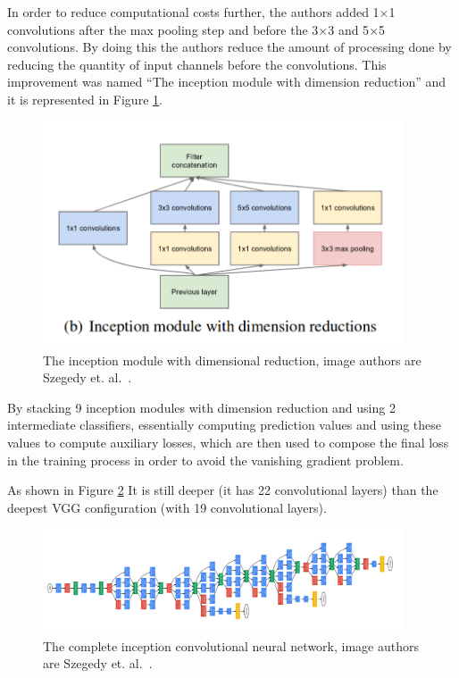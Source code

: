 In order to reduce computational costs further, the authors added 1$\times$1 convolutions after the max pooling step and before the 3$\times$3 and 5$\times$5 convolutions. By doing this the authors reduce the amount of processing done by reducing the quantity of input channels before the convolutions. This improvement was named ``The inception module with dimension reduction'' and it is represented in Figure \ref{fig:red-dim-inception}.  

\begin{figure}[!ht]
    \centering
    \includegraphics[width=0.95\textwidth]{img/inception-module.png}
    \caption{The inception module with dimensional reduction, image authors are Szegedy et. al.~\cite{szegedy2015Inception}.}
    \label{fig:red-dim-inception}
\end{figure}

By stacking 9 inception modules with dimension reduction and using 2 intermediate classifiers, essentially computing prediction values and using these values to compute auxiliary losses, which are then used to compose the final loss in the training process in order to avoid the vanishing gradient problem.

As shown in Figure \ref{fig:inception-architecture} It is still deeper (it has 22 convolutional layers) than the deepest VGG configuration (with 19 convolutional layers).

\begin{figure}[!ht]
    \centering
    \includegraphics[width=0.95\textwidth]{img/inception-architecture.png}
    \caption{The complete inception convolutional neural network, image authors are Szegedy et. al.~\cite{szegedy2015Inception}.}
    \label{fig:inception-architecture}
\end{figure}

